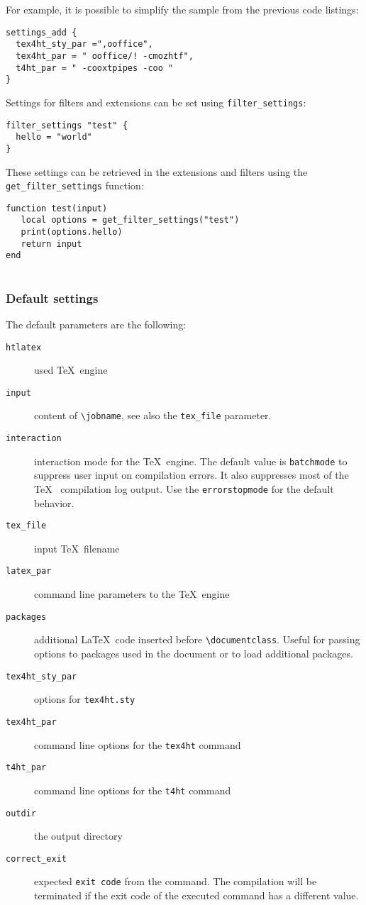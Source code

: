 For example, it is possible to simplify the sample from the previous
code listings:

\begin{verbatim}
settings_add {
  tex4ht_sty_par =",ooffice",
  tex4ht_par = " ooffice/! -cmozhtf",
  t4ht_par = " -cooxtpipes -coo "
}
\end{verbatim}

Settings for filters and extensions can be set using
\texttt{filter\_settings}:

\begin{verbatim}
filter_settings "test" {
  hello = "world"
}
\end{verbatim}

These settings can be retrieved in the extensions and filters using the
\texttt{get\_filter\_settings} function:

\begin{verbatim}
function test(input)
   local options = get_filter_settings("test")
   print(options.hello)
   return input
end
   
\end{verbatim}

\hypertarget{default-settings}{%
\subsubsection{Default settings}\label{default-settings}}

The default parameters are the following:

\begin{description}
\item[\texttt{htlatex}]
used \TeX~engine
\item[\texttt{input}]
content of \texttt{\textbackslash{}jobname}, see also the
\texttt{tex\_file} parameter.
\item[\texttt{interaction}]
interaction mode for the \TeX~engine. The default value is
\texttt{batchmode} to suppress user input on compilation errors. It also
suppresses most of the \TeX~ compilation log output. Use the
\texttt{errorstopmode} for the default behavior.
\item[\texttt{tex\_file}]
input \TeX~filename
\item[\texttt{latex\_par}]
command line parameters to the \TeX~engine
\item[\texttt{packages}]
additional \LaTeX~code inserted before
\texttt{\textbackslash{}documentclass}. Useful for passing options to
packages used in the document or to load additional packages.
\item[\texttt{tex4ht\_sty\_par}]
options for \texttt{tex4ht.sty}
\item[\texttt{tex4ht\_par}]
command line options for the \texttt{tex4ht} command
\item[\texttt{t4ht\_par}]
command line options for the \texttt{t4ht} command
\item[\texttt{outdir}]
the output directory
\item[\texttt{correct\_exit}]
expected \texttt{exit\ code} from the command. The compilation will be
terminated if the exit code of the executed command has a different
value.
\end{description}

